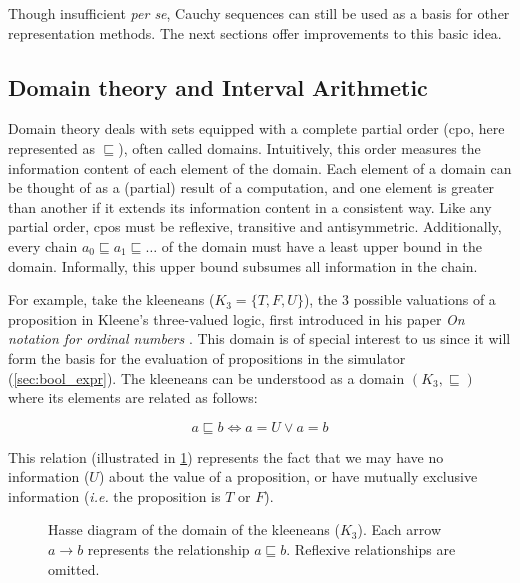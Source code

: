 Though insufficient \textit{per se}, Cauchy sequences can still be used as a basis for other representation methods. The next sections offer improvements to this basic idea.


\subsection{Domain theory and Interval Arithmetic}
\label{sec:domain}

Domain theory \cite{winskel93} deals with sets equipped with a complete partial order (cpo, here represented as $\sqsubseteq$), often called domains. Intuitively, this order measures the information content of each element of the domain. Each element of a domain can be thought of as a (partial) result of a computation, and one element is greater than another if it extends its information content in a consistent way. Like any partial order, cpos must be reflexive, transitive and antisymmetric. Additionally, every chain $a_0 \sqsubseteq a_1 \sqsubseteq \dots$ of the domain must have a least upper bound in the domain. Informally, this upper bound subsumes all information in the chain.

For example, take the kleeneans ($K_3 = \{T, F, U\}$), the 3 possible valuations of a proposition in Kleene's three-valued logic, first introduced in his paper  \textit{On notation for ordinal numbers} \cite{Kleene_1938}. This domain is of special interest to us since it will form the basis for the evaluation of propositions in the simulator (\cref{sec:bool_expr}). The kleeneans can be understood as a domain $(K_3,\sqsubseteq)$ where its elements are related as follows:

\begin{equation*}
  a \sqsubseteq b \iff a = U \vee a = b
\end{equation*}

This relation (illustrated in \cref{fig:kleeneans_dom}) represents the fact that we may have no information ($U$) about the value of a proposition, or have mutually exclusive information (\textit{i.e.} the proposition is $T$ or $F$).

\begin{figure}[h]
    \centering
    
    \caption{Hasse diagram of the domain of the kleeneans ($K_3$). Each arrow $a \rightarrow b$ represents the relationship $a \sqsubseteq b$. Reflexive relationships are omitted.}
    \label{fig:kleeneans_dom}
\end{figure}

